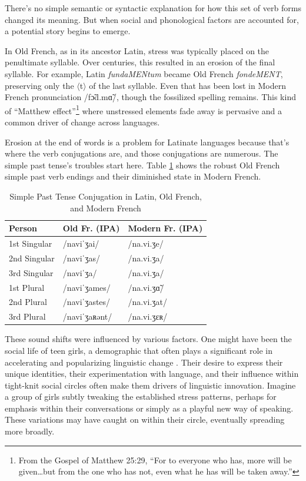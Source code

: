 There's no simple semantic or syntactic explanation for how this set of verb forms changed its meaning. But when social and phonological factors are accounted for, a potential story begins to emerge.

In Old French, as in its ancestor Latin, stress was typically placed on the penultimate syllable. Over centuries, this resulted in an erosion of the final syllable. For example, Latin \textit{fundaMENtum} became Old French \textit{fondeMENT}, preserving only the $\langle$t$\rangle$ of the last syllable. Even that has been lost in Modern French pronunciation /fɔ̃d.mɑ̃/, though the fossilized spelling remains. This kind of \enquote{Matthew effect}\footnote{From the Gospel of Matthew 25:29, \enquote{For to everyone who has, more will be given\dots but from the one who has not, even what he has will be taken away.}} where unstressed elements fade away is pervasive and a common driver of change across languages.

Erosion at the end of words is a problem for Latinate languages because that's where the verb conjugations are, and those conjugations are numerous. The simple past tense's troubles start here. Table \ref{table:past_tense_conjugation} shows the robust Old French simple past verb endings and their diminished state in Modern French.

\begin{table}[ht]
\centering
\begin{tabular}{lll}
\hline
\textbf{Person} & \textbf{Old Fr. (IPA)} & \textbf{Modern Fr. (IPA)} \\
\hline
1st Singular & /naviˈʒai/ & /na.vi.ʒe/ \\
2nd Singular  & /naviˈʒas/ & /na.vi.ʒa/ \\
3rd Singular  & /naviˈʒa/ & /na.vi.ʒa/ \\
1st Plural &  /naviˈʒames/ & /na.vi.ʒɑ̃/ \\
2nd Plural &  /naviˈʒastes/ & /na.vi.ʒat/ \\
3rd Plural &  /naviˈʒaʀənt/ & /na.vi.ʒɛʀ/ \\
\hline
\end{tabular}
\caption{Simple Past Tense Conjugation in Latin, Old French, and Modern French}
\label{table:past_tense_conjugation}
\end{table}

These sound shifts were influenced by various factors. One might have been the social life of teen girls, a demographic that often plays a significant role in accelerating and popularizing linguistic change \citep{labov2001}. Their desire to express their unique identities, their experimentation with language, and their influence within tight-knit social circles often make them drivers of linguistic innovation. Imagine a group of girls subtly tweaking the established stress patterns, perhaps for emphasis within their conversations or simply as a playful new way of speaking. These variations may have caught on within their circle, eventually spreading more broadly.

